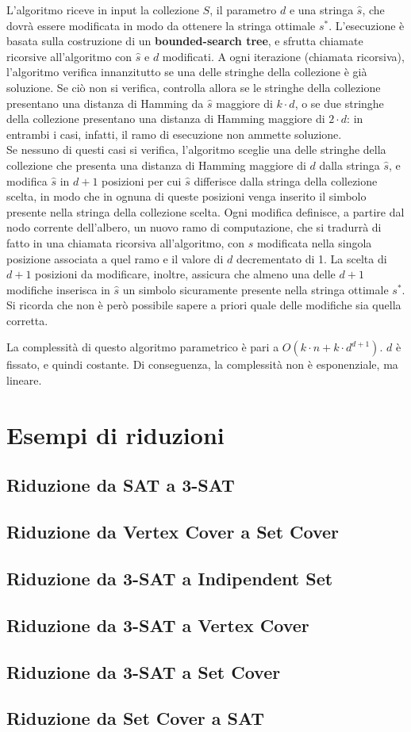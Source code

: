 L'algoritmo riceve in input la collezione $S$, il parametro $d$ e una stringa
$\hat{s}$, che dovrà essere modificata in modo da ottenere la stringa ottimale
$s^*$.
L'esecuzione è basata sulla costruzione di un \textbf{bounded-search tree}, e
sfrutta chiamate ricorsive all'algoritmo con $\hat{s}$ e $d$ modificati.
A ogni iterazione (chiamata ricorsiva), l'algoritmo verifica innanzitutto
se una delle stringhe della collezione è già soluzione. Se ciò non si verifica,
controlla allora se le stringhe della collezione presentano una distanza di
Hamming da $\hat{s}$ maggiore di $k \cdot d$, o se due stringhe della
collezione presentano una distanza di Hamming maggiore di $2 \cdot d$:
in entrambi i casi, infatti, il ramo di esecuzione non ammette soluzione.\\
Se nessuno di questi casi si verifica, l'algoritmo sceglie una delle stringhe
della collezione che presenta una distanza di Hamming maggiore di $d$ dalla
stringa $\hat{s}$, e modifica $\hat{s}$ in $d+1$ posizioni per cui $\hat{s}$
differisce dalla stringa della collezione scelta, in modo che
in ognuna di queste posizioni venga inserito il simbolo presente nella
stringa della collezione scelta.
Ogni modifica definisce, a partire dal nodo corrente dell'albero,
un nuovo ramo di computazione, che si tradurrà di fatto in una chiamata ricorsiva
all'algoritmo, con $\hat{s}$ modificata nella singola posizione associata
a quel ramo e il valore di $d$ decrementato di 1.
La scelta di $d+1$ posizioni da modificare, inoltre, assicura che almeno una
delle $d+1$ modifiche inserisca in $\hat{s}$ un simbolo sicuramente presente
nella stringa ottimale $s^*$. Si ricorda che non è però possibile sapere
a priori quale delle modifiche sia quella corretta.


La complessità di questo algoritmo parametrico è pari a
$O(k \cdot n + k \cdot d^{d+1})$.
$d$ è fissato, e quindi costante. Di conseguenza, la complessità non è
esponenziale, ma lineare.



\chapter{Esempi di riduzioni}
\section{Riduzione da SAT a 3-SAT}
\section{Riduzione da Vertex Cover a Set Cover}
\section{Riduzione da 3-SAT a Indipendent Set}
\section{Riduzione da 3-SAT a Vertex Cover}
\section{Riduzione da 3-SAT a Set Cover}
\section{Riduzione da Set Cover a SAT}
